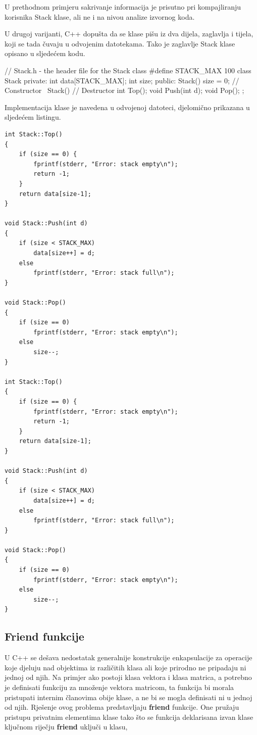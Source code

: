 \documentclass[11pt]{book}
\begin{document}
U prethodnom primjeru sakrivanje informacija je prisutno pri kompajliranju korisnika  Stack klase, ali ne i na nivou analize izvornog koda.

U drugoj varijanti, C++ dopušta da se klase pišu iz dva dijela, zaglavlja i tijela, koji se tada čuvaju u odvojenim datotekama. Tako je zaglavlje Stack klase opisano u sljedećem kodu.

\begin{shortlisting}
  // Stack.h - the header file for the Stack class
  #define STACK_MAX 100
  class Stack {
      private:
      int        data[STACK_MAX];
      int        size;
      public:
      Stack() { size = 0; }    // Constructor
      ~Stack() { }             // Destructor
      int Top();
      void Push(int d);
      void Pop();
    };
\end{shortlisting}

Implementacija klase je navedena u odvojenoj datoteci, djelomično prikazana u sljedećem listingu.
\begin{lstlisting}
int Stack::Top()
{
    if (size == 0) {
        fprintf(stderr, "Error: stack empty\n");
        return -1;
    }
    return data[size-1];
}

void Stack::Push(int d)
{
    if (size < STACK_MAX)
        data[size++] = d;
    else
        fprintf(stderr, "Error: stack full\n");
}

void Stack::Pop()
{
    if (size == 0)
        fprintf(stderr, "Error: stack empty\n");
    else
        size--;
}

int Stack::Top()
{
    if (size == 0) {
        fprintf(stderr, "Error: stack empty\n");
        return -1;
    }
    return data[size-1];
}

void Stack::Push(int d)
{
    if (size < STACK_MAX)
        data[size++] = d;
    else
        fprintf(stderr, "Error: stack full\n");
}

void Stack::Pop()
{
    if (size == 0)
        fprintf(stderr, "Error: stack empty\n");
    else
        size--;
}
\end{lstlisting}


\subsection{Friend funkcije}

U C++ se dešava nedostatak generalnije konstrukcije enkapsulacije za operacije koje djeluju nad objektima iz različitih klasa ali koje prirodno ne pripadaju ni jednoj od njih. Na primjer ako postoji klasa vektora i klasa matrica, a potrebno je definisati funkciju za množenje vektora matricom, ta funkcija bi morala pristupati internim članovima obije klase, a ne bi se mogla definisati ni u jednoj od njih. Rješenje ovog problema predstavljaju \textbf{friend} funkcije. One pružaju pristupu privatnim  elementima klase tako što se funkcija deklarisana izvan klase ključnom riječju \textbf{friend} uključi u klasu,
\end{document}
